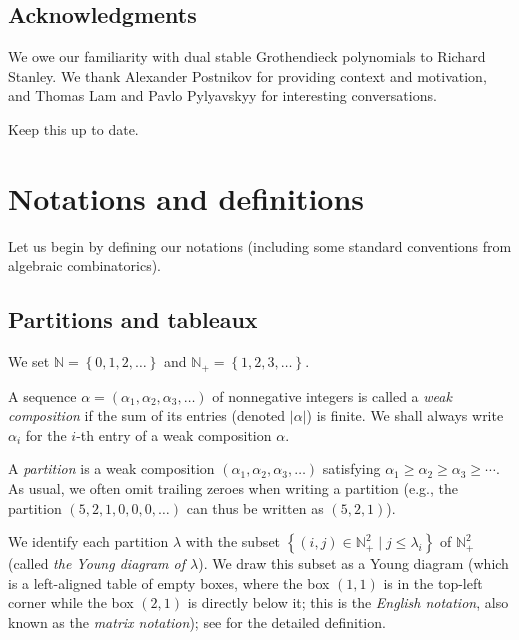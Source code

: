 \documentclass[numbers=enddot,12pt,final,onecolumn,notitlepage]{scrartcl}%
\theoremstyle{definition}
\newenvironment{todo}{}{}
\newcommand{\Nplus}{\mathbb{N}_{+}}
\begin{document}
\subsection{Acknowledgments}

We owe our familiarity with dual stable Grothendieck polynomials to Richard
Stanley. We thank Alexander Postnikov for providing context and motivation,
and Thomas Lam and Pavlo Pylyavskyy for interesting conversations.

\begin{todo}
Keep this up to date.
\end{todo}

\section{\label{sect.notations}Notations and definitions}

Let us begin by defining our notations (including some standard conventions
from algebraic combinatorics).

\subsection{Partitions and tableaux}

We set $\mathbb{N}=\left\{  0,1,2,\ldots\right\}  $ and $\mathbb{N}%
_{+}=\left\{  1,2,3,\ldots\right\}  $. 


 A sequence $\alpha=\left(\alpha_{1},\alpha_{2},\alpha_{3},\ldots\right)$ of nonnegative integers is called a \textit{weak composition} if the sum of its entries (denoted $\left\vert \alpha\right\vert$) is finite.
 We shall always write $\alpha_i$ for the $i$-th entry of a weak composition $\alpha$.



A \textit{partition} is a weak composition $\left(  \alpha_{1},\alpha
_{2},\alpha_{3},\ldots\right)  $ satisfying $\alpha_{1}\geq\alpha_{2}
\geq\alpha_{3}\geq\cdots$.
As usual, we often omit trailing zeroes when writing a partition (e.g.,
the partition $\left(5,2,1,0,0,0,\ldots\right)$ can thus be written as
$\left(5,2,1\right)$).

We identify each partition $\lambda$ with the subset
$\left\{ \left( i, j \right) \in \Nplus^2 \mid j \leq \lambda_i \right\}$
of $\Nplus^{2}$ (called \textit{the Young diagram of $\lambda$}).
We draw this subset as a Young diagram (which is a left-aligned table of
empty boxes, where the box $(1,1)$ is in the top-left corner while the
box $(2,1)$ is directly below it; this is the \textit{English notation},
also known as the \textit{matrix notation}); see \cite{Fulton97} for
the detailed definition.
\end{document}
